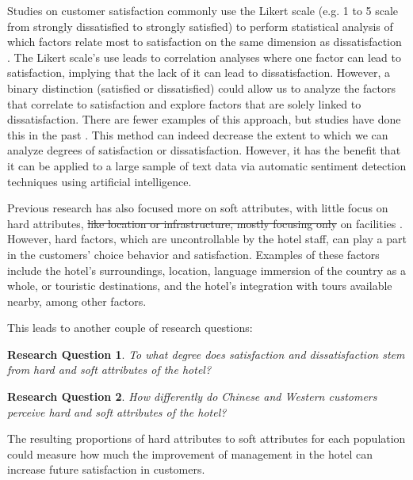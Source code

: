 \documentclass[smallextended,natbib]{svjour3}       %
\makeatletter
\newtheorem{rsq}{Research Question}
\newcounter{subrsq}
\newenvironment{subrsq}
         {%
          \setcounter{subrsq}{0}%
          \stepcounter{rsq}%
          \edef\saved@rsq{\thersq}%
          \let\c@rsq\c@subrsq     %
          \renewcommand{\thersq}{\saved@rsq\alph{rsq}}%
         }
         {}
\providecommand{\DIFadd}[1]{{\protect\color{blue}\uwave{#1}}} %
\providecommand{\DIFdel}[1]{{\protect\color{red}\sout{#1}}}                      %
\providecommand{\DIFaddbegin}{} %
\providecommand{\DIFaddend}{} %
\providecommand{\DIFdelbegin}{} %
\providecommand{\DIFdelend}{} %
\newcommand{\DIFscaledelfig}{0.5}
\newlength{\DIFdelgraphicswidth} %
\newlength{\DIFdelgraphicsheight} %
\newcommand{\DIFaddincludegraphics}[2][]{{\color{blue}\fbox{\DIFOincludegraphics[#1]{#2}}}} %
\newcommand{\DIFdelincludegraphics}[2][]{%
\sbox{\DIFdelgraphicsbox}{\DIFOincludegraphics[#1]{#2}}%
\settoboxwidth{\DIFdelgraphicswidth}{\DIFdelgraphicsbox} %
\settoboxtotalheight{\DIFdelgraphicsheight}{\DIFdelgraphicsbox} %
\scalebox{\DIFscaledelfig}{%
\parbox[b]{\DIFdelgraphicswidth}{\usebox{\DIFdelgraphicsbox}\\[-\baselineskip] \rule{\DIFdelgraphicswidth}{0em}}\llap{\resizebox{\DIFdelgraphicswidth}{\DIFdelgraphicsheight}{%
\setlength{\unitlength}{\DIFdelgraphicswidth}%
\begin{picture}(1,1)%
\thicklines\linethickness{2pt} %
{\color[rgb]{1,0,0}\put(0,0){\framebox(1,1){}}}%
{\color[rgb]{1,0,0}\put(0,0){\line( 1,1){1}}}%
{\color[rgb]{1,0,0}\put(0,1){\line(1,-1){1}}}%
\end{picture}%
}\hspace*{3pt}}} %
} %
\DeclareRobustCommand{\DIFaddbegin}{\DIFOaddbegin \let\includegraphics\DIFaddincludegraphics} %
\DeclareRobustCommand{\DIFaddend}{\DIFOaddend \let\includegraphics\DIFOincludegraphics} %
\DeclareRobustCommand{\DIFdelbegin}{\DIFOdelbegin \let\includegraphics\DIFdelincludegraphics} %
\DeclareRobustCommand{\DIFdelend}{\DIFOaddend \let\includegraphics\DIFOincludegraphics} %
\makeatother
\begin{document}
    Studies on customer satisfaction \cite[e.g.][]{truong2009, romao2014, wu2009} commonly use the Likert scale \cite[][]{likert1932technique} (e.g. 1 to 5 scale from strongly dissatisfied to strongly satisfied) to perform statistical analysis of which factors relate most to satisfaction on the same dimension as dissatisfaction \cite[e.g.][]{chan201518, choi2000}. The Likert scale's use leads to correlation analyses where one factor can lead to satisfaction, implying that the lack of it can lead to dissatisfaction. However, a binary distinction (satisfied or dissatisfied) could allow us to analyze the factors that correlate to satisfaction and explore factors that are solely linked to dissatisfaction. There are fewer examples of this approach, but studies have done this in the past \cite[e.g.][]{zhou2014}. This method can indeed decrease the extent to which we can analyze degrees of satisfaction or dissatisfaction. However, it has the benefit that it can be applied to a large sample of text data via automatic sentiment detection techniques using artificial intelligence. 

    Previous research has also focused more on soft attributes, with little focus on hard attributes, \DIFdelbegin \DIFdel{like location or infrastructure, mostly focusing only }\DIFdelend \DIFaddbegin \DIFadd{if only focusing }\DIFaddend on facilities \cite[e.g.][]{shanka2004, choi2001}. However, hard factors, which are uncontrollable by the hotel staff, can play a part in the customers' choice behavior and satisfaction. Examples of these factors include the hotel's surroundings, location, language immersion of the country as a whole, or touristic destinations, and the hotel's integration with tours available nearby, among other factors. 

    This leads to another couple of research questions:

    \begin{subrsq}
    \begin{rsq}
    \label{rsq:hard_soft}
    To what degree does satisfaction and dissatisfaction stem from hard and soft attributes of the hotel?
    \end{rsq}

    \begin{rsq}
    \label{rsq:hard_soft_diff}
    How differently do Chinese and Western customers perceive hard and soft attributes of the hotel?
    \end{rsq}
    \end{subrsq}

    The resulting proportions of hard attributes to soft attributes for each population could measure how much the improvement of management in the hotel can increase future satisfaction in customers. 
\end{document}
